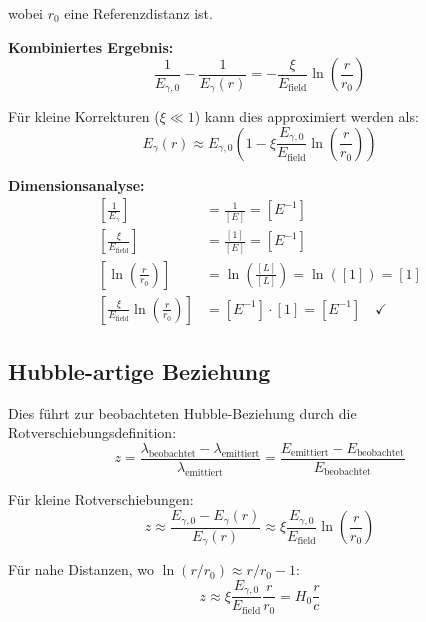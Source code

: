 \documentclass[12pt,a4paper]{report}
\begin{document}
	wobei $r_0$ eine Referenzdistanz ist.
	
	\textbf{Kombiniertes Ergebnis:}
	\begin{equation}
		\frac{1}{E_{\gamma,0}} - \frac{1}{E_\gamma(r)} = -\frac{\xi}{E_{\text{field}}} \ln\left(\frac{r}{r_0}\right)
	\end{equation}
	
	Für kleine Korrekturen ($\xi \ll 1$) kann dies approximiert werden als:
	\begin{equation}
		E_\gamma(r) \approx E_{\gamma,0} \left(1 - \xi \frac{E_{\gamma,0}}{E_{\text{field}}} \ln\left(\frac{r}{r_0}\right)\right)
	\end{equation}
	
	\textbf{Dimensionsanalyse:}
	\begin{align}
		\left[\frac{1}{E_\gamma}\right] &= \frac{1}{[E]} = [E^{-1}] \\
		\left[\frac{\xi}{E_{\text{field}}}\right] &= \frac{[1]}{[E]} = [E^{-1}] \\
		\left[\ln\left(\frac{r}{r_0}\right)\right] &= \ln\left(\frac{[L]}{[L]}\right) = \ln([1]) = [1] \\
		\left[\frac{\xi}{E_{\text{field}}} \ln\left(\frac{r}{r_0}\right)\right] &= [E^{-1}] \cdot [1] = [E^{-1}] \quad \checkmark
	\end{align}
	
	\subsection{Hubble-artige Beziehung}
	\label{subsec:hubble_like_relation}
	
	Dies führt zur beobachteten Hubble-Beziehung durch die Rotverschiebungsdefinition:
	\begin{equation}
		z = \frac{\lambda_{\text{beobachtet}} - \lambda_{\text{emittiert}}}{\lambda_{\text{emittiert}}} = \frac{E_{\text{emittiert}} - E_{\text{beobachtet}}}{E_{\text{beobachtet}}}
	\end{equation}
	
	Für kleine Rotverschiebungen:
	\begin{equation}
		z \approx \frac{E_{\gamma,0} - E_\gamma(r)}{E_\gamma(r)} \approx \xi \frac{E_{\gamma,0}}{E_{\text{field}}} \ln\left(\frac{r}{r_0}\right)
	\end{equation}
	
	Für nahe Distanzen, wo $\ln(r/r_0) \approx r/r_0 - 1$:
	\begin{equation}
		z \approx \xi \frac{E_{\gamma,0}}{E_{\text{field}}} \frac{r}{r_0} = H_0 \frac{r}{c}
	\end{equation}
	
\end{document}
